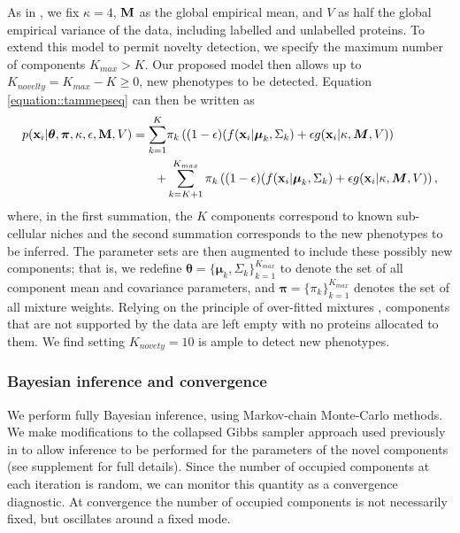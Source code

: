\documentclass[12pt,english]{article}
\begin{document}
As in \cite{Crook:2018}, we fix $\kappa = 4$, ${\bf M}$ as the global empirical mean, and $V$
as half the global empirical variance of the data, including labelled and unlabelled proteins. To extend this model to permit novelty detection, we specify the maximum number of components $K_{max} > K$. Our proposed model then allows up to $K_{novelty} = K_{max} - K \geq 0$, new phenotypes to be detected. Equation \ref{equation::tammepseq} can then be written as 
\begin{equation}\label{equation::tammepseq2}
\begin{split}
p({\bf x}_i| \boldsymbol{\theta}, \boldsymbol{\pi} , \kappa, \epsilon, {\bf M}, V) =  \sum_{k=1}^{K}&\pi_k\left((1-\epsilon)(f({\bf x}_i |\boldsymbol{\mu}_k, \Sigma_k) + \epsilon g({\bf x}_i|\kappa, \boldsymbol{M}, V)\right)\\
+ & \sum_{k=K+1}^{K_{max}}\pi_k\left((1-\epsilon)(f({\bf x}_i |\boldsymbol{\mu}_k, \Sigma_k) + \epsilon g({\bf x}_i|\kappa, \boldsymbol{M}, V)\right),
\end{split}
\end{equation}
where, in the first summation, the $K$ components correspond to known sub-cellular niches and the second summation corresponds to the new phenotypes to be inferred. The parameter sets are then augmented to include these possibly new components; that is, we redefine 
$\boldsymbol{\theta} = \{\boldsymbol{\mu}_k, \Sigma_k \}_{k = 1}^{K_{max}}$
to denote the set of all component mean and covariance parameters, and
$\boldsymbol{\pi} = \{\pi_k\}_{k = 1}^{K_{max}}$ denotes the set of all mixture
weights. Relying on the principle of over-fitted mixtures \cite{Rousseau::2011}, components that are not supported by the data are left empty with no proteins allocated to them. We find setting $K_{novety} = 10$ is ample to detect new phenotypes.   
\subsubsection{Bayesian inference and convergence}
We perform fully Bayesian inference, using Markov-chain Monte-Carlo methods. We make modifications to the collapsed Gibbs sampler approach used previously in \cite{Crook:2018} to allow inference to be performed for the parameters of the novel components (see supplement for full details). Since the number of occupied components at each iteration is random, we can monitor this quantity as a convergence diagnostic. At convergence the number of occupied components is not necessarily fixed, but oscillates around a fixed mode.
\end{document}
